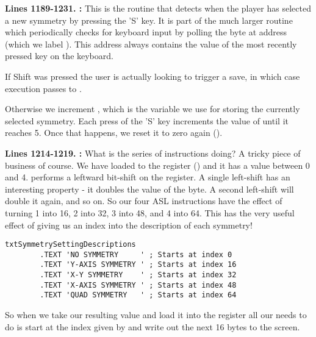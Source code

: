 \textbf{Lines 1189-1231. :} This is the routine that detects when the player has selected a new
symmetry by pressing the 'S' key. It is part of the much larger routine  which periodically checks
for keyboard input by polling the byte at address  (which we label ). This address always
contains the value of the most recently pressed key on the keyboard.

If Shift was pressed the user is actually looking to trigger a save, in which case execution passes to .

Otherwise we increment , which is the variable we use for storing the currently selected symmetry.
Each press of the 'S' key increments the value of  until it reaches 5. Once that happens, we 
reset it to zero again ().

\textbf{Lines 1214-1219. :} What is the series of  instructions doing? A tricky
piece of business of course. We have loaded  to the  register () and it has a value between 0 and 4.
 performs a leftward bit-shift on the  register. A single left-shift has an interesting property - it doubles the
value of the byte. A second left-shift will double it again, and so on. So our four {ASL} instructions have the effect of turning 1 into
16, 2 into 32, 3 into 48, and 4 into 64. This has the very useful effect of giving us an index into the description of each symmetry!

\begin{lstlisting}
txtSymmetrySettingDescriptions 
        .TEXT 'NO SYMMETRY     ' ; Starts at index 0
        .TEXT 'Y-AXIS SYMMETRY ' ; Starts at index 16
        .TEXT 'X-Y SYMMETRY    ' ; Starts at index 32
        .TEXT 'X-AXIS SYMMETRY ' ; Starts at index 48
        .TEXT 'QUAD SYMMETRY   ' ; Starts at index 64
\end{lstlisting}

So when we take our resulting value and load it into the  register all our  needs to do is start at the 
index given by  and write out the next 16 bytes to the screen.


